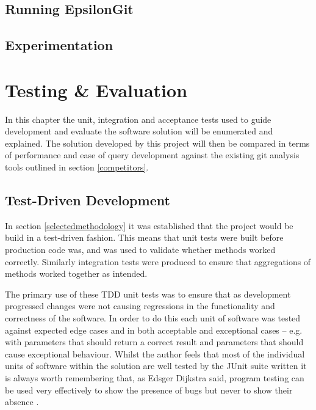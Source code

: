 \documentclass[11pt]{book}
\begin{document}
\section{Running EpsilonGit}

\section{Experimentation}


\chapter{Testing \& Evaluation}
\label{testeval}
In this chapter the unit, integration and acceptance tests used to guide development and evaluate the software solution will be enumerated and explained. The solution developed by this project will then be compared in terms of performance and ease of query development against the existing git analysis tools outlined in section \ref{competitors}.

\section{Test-Driven Development}
In section \ref{selectedmethodology} it was established that the project would be build in a test-driven fashion. This means that unit tests were built before production code was, and was used to validate whether methods worked correctly. Similarly integration tests were produced to ensure that aggregations of methods worked together as intended.

The primary use of these TDD unit tests was to ensure that as development progressed changes were not causing regressions in the functionality and correctness of the software. In order to do this each unit of software was tested against expected edge cases and in both acceptable and exceptional cases -- e.g. with parameters that should return a correct result and parameters that should cause exceptional behaviour. Whilst the author feels that most of the individual units of software within the solution are well tested by the JUnit suite written it is always worth remembering that, as Edsger Dijkstra said, program testing can be used very effectively to show the presence of bugs but never to show their absence \cite{edsger}.
\end{document}
